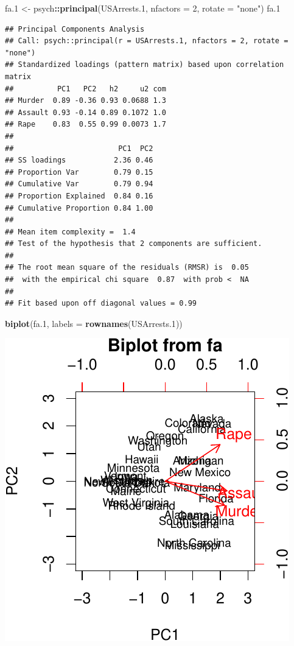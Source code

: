 \documentclass[]{book}
\newenvironment{Shaded}{\begin{snugshade}}{\end{snugshade}}
\newcommand{\DataTypeTok}[1]{\textcolor[rgb]{0.13,0.29,0.53}{#1}}
\newcommand{\DecValTok}[1]{\textcolor[rgb]{0.00,0.00,0.81}{#1}}
\newcommand{\FloatTok}[1]{\textcolor[rgb]{0.00,0.00,0.81}{#1}}
\newcommand{\KeywordTok}[1]{\textcolor[rgb]{0.13,0.29,0.53}{\textbf{#1}}}
\newcommand{\NormalTok}[1]{#1}
\newcommand{\OperatorTok}[1]{\textcolor[rgb]{0.81,0.36,0.00}{\textbf{#1}}}
\newcommand{\StringTok}[1]{\textcolor[rgb]{0.31,0.60,0.02}{#1}}
\theoremstyle{definition}
\theoremstyle{definition}
\theoremstyle{definition}
\theoremstyle{remark}
\begin{document}
\begin{Shaded}
\begin{Highlighting}[]
\NormalTok{fa}\FloatTok{.1}\NormalTok{ <-}\StringTok{ }\NormalTok{psych}\OperatorTok{::}\KeywordTok{principal}\NormalTok{(USArrests}\FloatTok{.1}\NormalTok{, }\DataTypeTok{nfactors =} \DecValTok{2}\NormalTok{, }\DataTypeTok{rotate =} \StringTok{"none"}\NormalTok{)}
\NormalTok{fa}\FloatTok{.1}
\end{Highlighting}
\end{Shaded}

\begin{verbatim}
## Principal Components Analysis
## Call: psych::principal(r = USArrests.1, nfactors = 2, rotate = "none")
## Standardized loadings (pattern matrix) based upon correlation matrix
##          PC1   PC2   h2     u2 com
## Murder  0.89 -0.36 0.93 0.0688 1.3
## Assault 0.93 -0.14 0.89 0.1072 1.0
## Rape    0.83  0.55 0.99 0.0073 1.7
## 
##                        PC1  PC2
## SS loadings           2.36 0.46
## Proportion Var        0.79 0.15
## Cumulative Var        0.79 0.94
## Proportion Explained  0.84 0.16
## Cumulative Proportion 0.84 1.00
## 
## Mean item complexity =  1.4
## Test of the hypothesis that 2 components are sufficient.
## 
## The root mean square of the residuals (RMSR) is  0.05 
##  with the empirical chi square  0.87  with prob <  NA 
## 
## Fit based upon off diagonal values = 0.99
\end{verbatim}

\begin{Shaded}
\begin{Highlighting}[]
\KeywordTok{biplot}\NormalTok{(fa}\FloatTok{.1}\NormalTok{, }\DataTypeTok{labels =}  \KeywordTok{rownames}\NormalTok{(USArrests}\FloatTok{.1}\NormalTok{)) }
\end{Highlighting}
\end{Shaded}

\includegraphics[width=0.5\linewidth]{Rcourse_files/figure-latex/FA-1}
\end{document}
